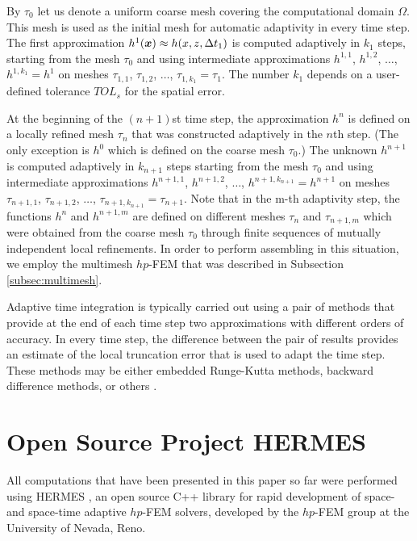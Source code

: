 \documentclass[final,3p,times,twocolumn]{elsarticle}
\newcommand{\bfx}{\mbox{\boldmath $x$}}
\begin{document}
By $\tau_0$ let us denote a uniform coarse mesh covering the computational domain $\Omega$. This
mesh is used as the initial mesh for automatic adaptivity in every time step.
The first approximation $h^1(\bfx) \approx h(x, z, \Delta t_1)$ is computed adaptively 
in $k_1$ steps, starting from the 
mesh $\tau_0$ and using intermediate approximations $h^{1,1}$, $h^{1,2}$, $\ldots$, $h^{1,k_1} = h^1$ 
on meshes $\tau_{1,1}$, $\tau_{1,2}$, $\ldots$, $\tau_{1,k_{1}} = \tau_{1}$. The number $k_1$ depends 
on a user-defined tolerance $TOL_s$ for the spatial error. 

At the beginning of the $(n+1)$st time step, the approximation $h^n$ is defined on a locally 
refined mesh $\tau_n$ that was constructed adaptively in the $n$th step.
(The only exception is $h^0$ which is defined on the coarse mesh $\tau_0$.)
The unknown $h^{n+1}$ is computed adaptively in $k_{n+1}$ steps starting from the 
mesh $\tau_0$ and using intermediate approximations $h^{n+1,1}$, $h^{n+1,2}$, $\ldots$, $h^{n+1,k_{n+1}} = h^{n+1}$ 
on meshes $\tau_{n+1,1}$, $\tau_{n+1,2}$, $\ldots$, $\tau_{n+1,k_{n+1}} = \tau_{n+1}$. 
Note that in the m-th adaptivity step, the functions $h^n$ and $h^{n+1, m}$ are defined on 
different meshes $\tau_n$ and $\tau_{n+1,m}$ which were obtained 
from the coarse mesh $\tau_0$ through finite sequences of mutually independent 
local refinements. In order to perform assembling in this situation, we employ the 
multimesh $hp$-FEM that was described in Subsection \ref{subsec:multimesh}.

Adaptive time integration is typically carried out using a pair of 
methods that provide at the end of each time step two approximations 
with different orders of accuracy. In every time step, the difference between the pair of 
results provides an estimate of the local truncation error that is used to adapt the time 
step. These methods may be either embedded Runge-Kutta
methods, backward difference methods, or others \cite{hairer}. 




\section{Open Source Project HERMES}
\label{sec:hermes}

All computations that have been presented in this paper so far 
were performed using HERMES \cite{hermes}, 
an open source C++ library for rapid development of space- and 
space-time adaptive $hp$-FEM solvers, developed by the $hp$-FEM group 
at the University of Nevada, Reno.  
\end{document}
